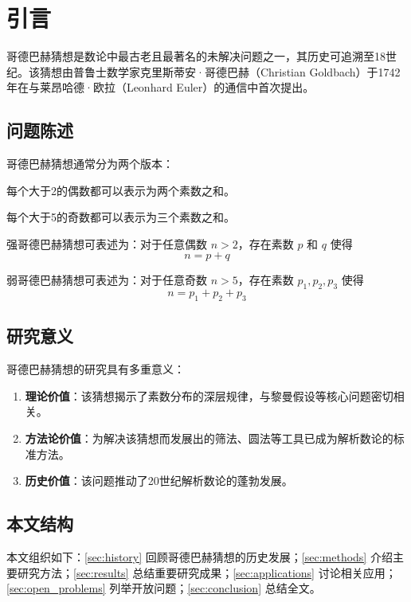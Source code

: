 \section{引言}\label{sec:introduction}

哥德巴赫猜想是数论中最古老且最著名的未解决问题之一，其历史可追溯至18世纪。该猜想由普鲁士数学家克里斯蒂安·哥德巴赫（Christian Goldbach）于1742年在与莱昂哈德·欧拉（Leonhard Euler）的通信中首次提出。

\subsection{问题陈述}

哥德巴赫猜想通常分为两个版本：

\begin{definition}[强哥德巴赫猜想]
    每个大于2的偶数都可以表示为两个素数之和。
\end{definition}

\begin{definition}[弱哥德巴赫猜想]
    每个大于5的奇数都可以表示为三个素数之和。
\end{definition}

强哥德巴赫猜想可表述为：对于任意偶数 $n > 2$，存在素数 $p$ 和 $q$ 使得
\begin{equation}
    n = p + q
\end{equation}

弱哥德巴赫猜想可表述为：对于任意奇数 $n > 5$，存在素数 $p_1, p_2, p_3$ 使得
\begin{equation}
    n = p_1 + p_2 + p_3
\end{equation}

\subsection{研究意义}

哥德巴赫猜想的研究具有多重意义：

\begin{enumerate}[label=(\arabic*)]
    \item \textbf{理论价值}：该猜想揭示了素数分布的深层规律，与黎曼假设等核心问题密切相关。
    \item \textbf{方法论价值}：为解决该猜想而发展出的筛法、圆法等工具已成为解析数论的标准方法。
    \item \textbf{历史价值}：该问题推动了20世纪解析数论的蓬勃发展。
\end{enumerate}

\subsection{本文结构}

本文组织如下：\cref{sec:history} 回顾哥德巴赫猜想的历史发展；\cref{sec:methods} 介绍主要研究方法；\cref{sec:results} 总结重要研究成果；\cref{sec:applications} 讨论相关应用；\cref{sec:open_problems} 列举开放问题；\cref{sec:conclusion} 总结全文。
